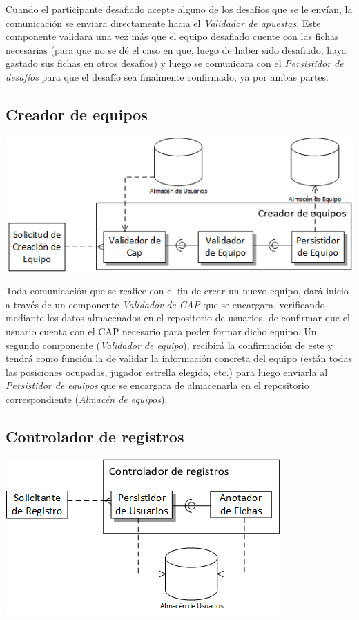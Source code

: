 Cuando el participante desafiado acepte alguno de los desafíos que se le envían, la comunicación se enviara directamente hacia el \emph{Validador de apuestas}. Este componente validara una vez más que el equipo desafiado cuente con las fichas necesarias (para que no se dé el caso en que, luego de haber sido desafiado, haya gastado sus fichas en otros desafíos) y luego se comunicara con el \emph{Persistidor de desafíos} para que el desafío sea finalmente confirmado, ya por ambas partes.

\subsection{Creador de equipos}
\begin{center}
\includegraphics[scale=0.80]{diagramas/tp1/equipo.png}
\end{center}
\label{fig:equipo}

Toda comunicación que se realice con el fin de crear un nuevo equipo, dará inicio a través de un componente \emph{Validador de CAP} que se encargara, verificando mediante los datos almacenados en el repositorio de usuarios, de confirmar que el usuario cuenta con el CAP necesario para poder formar dicho equipo. Un segundo componente (\emph{Validador de equipo}), recibirá la confirmación de este y tendrá como función la de validar la información concreta del equipo (están todas las posiciones ocupadas, jugador estrella elegido, etc.) para luego enviarla al \emph{Persistidor de equipos} que se encargara de almacenarla en el repositorio correspondiente (\emph{Almacén de equipos}).

\subsection{Controlador de registros}
\begin{center}
\includegraphics[scale=0.80]{diagramas/tp1/registros.png}
\end{center}
\label{fig:registros}

